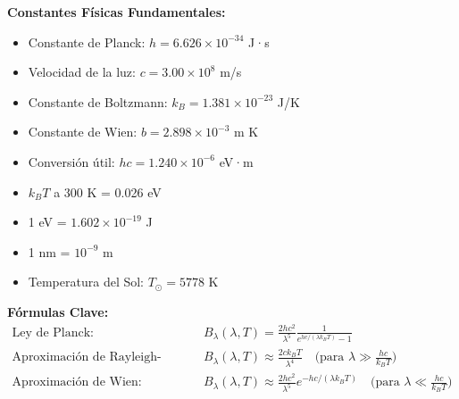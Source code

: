 \documentclass[12pt,a4paper]{article}
\begin{document}
	\begin{notabox}
		\textbf{Constantes Físicas Fundamentales:}
		\begin{multicols}{2}
			\begin{itemize}[leftmargin=1cm]
				\item Constante de Planck: $h = 6.626 \times 10^{-34}$ J·s
				\item Velocidad de la luz: $c = 3.00 \times 10^{8}$ m/s
				\item Constante de Boltzmann: $k_B = 1.381 \times 10^{-23}$ J/K
				\item Constante de Wien: $b = 2.898 \times 10^{-3}$ m K
			\end{itemize}
			
			\columnbreak
			
			\begin{itemize}[leftmargin=1cm]
				\item Conversión útil: $hc = 1.240 \times 10^{-6}$ eV·m
				\item $k_B T$ a 300 K = 0.026 eV
				\item 1 eV = $1.602 \times 10^{-19}$ J
				\item 1 nm = $10^{-9}$ m
				\item Temperatura del Sol: $T_{\odot} = 5778$ K
			\end{itemize}
		\end{multicols}
		
		\textbf{Fórmulas Clave:}
		\begin{align}
			\text{Ley de Planck: } & \quad B_{\lambda}(\lambda, T) = \frac{2hc^{2}}{\lambda^{5}} \frac{1}{e^{hc/(\lambda k_{B}T)}-1} \\
			\text{Aproximación de Rayleigh-Jeans: } & \quad B_{\lambda}(\lambda, T) \approx \frac{2ck_{B}T}{\lambda^{4}} \quad \text{(para } \lambda \gg \frac{hc}{k_BT}\text{)} \\
			\text{Aproximación de Wien: } & \quad B_{\lambda}(\lambda, T) \approx \frac{2hc^{2}}{\lambda^{5}} e^{-hc/(\lambda k_{B}T)} \quad \text{(para } \lambda \ll \frac{hc}{k_BT}\text{)}
		\end{align}
	\end{notabox}
	
	
\end{document}
